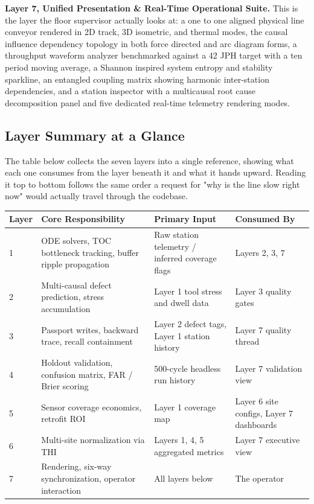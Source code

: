 \documentclass[11pt]{article}
\begin{document}
\textbf{Layer 7, Unified Presentation \& Real-Time Operational Suite.} This is the layer the floor supervisor actually looks at: a one to one aligned physical line conveyor rendered in 2D track, 3D isometric, and thermal modes, the causal influence dependency topology in both force directed and arc diagram forms, a throughput waveform analyzer benchmarked against a 42 JPH target with a ten period moving average, a Shannon inspired system entropy and stability sparkline, an entangled coupling matrix showing harmonic inter-station dependencies, and a station inspector with a multicausal root cause decomposition panel and five dedicated real-time telemetry rendering modes.

\subsection{Layer Summary at a Glance}

The table below collects the seven layers into a single reference, showing what each one consumes from the layer beneath it and what it hands upward. Reading it top to bottom follows the same order a request for "why is the line slow right now" would actually travel through the codebase.

\begin{center}
\small
\begin{tabular}{p{1.4cm}p{4.6cm}p{4.0cm}p{3.8cm}}
\toprule
\textbf{Layer} & \textbf{Core Responsibility} & \textbf{Primary Input} & \textbf{Consumed By} \\
\midrule
1 & ODE solvers, TOC bottleneck tracking, buffer ripple propagation & Raw station telemetry / inferred coverage flags & Layers 2, 3, 7 \\[3pt]
2 & Multi-causal defect prediction, stress accumulation & Layer 1 tool stress and dwell data & Layer 3 quality gates \\[3pt]
3 & Passport writes, backward trace, recall containment & Layer 2 defect tags, Layer 1 station history & Layer 7 quality thread \\[3pt]
4 & Holdout validation, confusion matrix, FAR / Brier scoring & 500-cycle headless run history & Layer 7 validation view \\[3pt]
5 & Sensor coverage economics, retrofit ROI & Layer 1 coverage map & Layer 6 site configs, Layer 7 dashboards \\[3pt]
6 & Multi-site normalization via THI & Layers 1, 4, 5 aggregated metrics & Layer 7 executive view \\[3pt]
7 & Rendering, six-way synchronization, operator interaction & All layers below & The operator \\
\bottomrule
\end{tabular}
\end{center}
\end{document}
